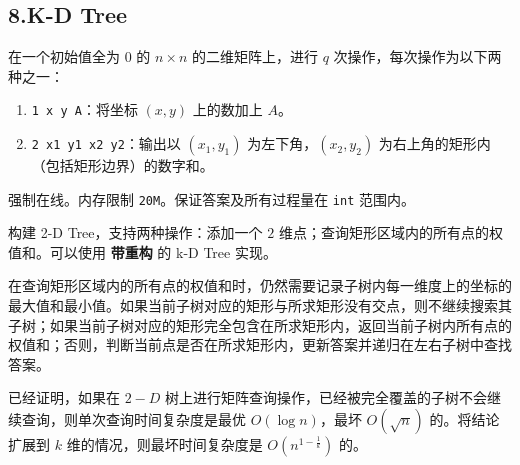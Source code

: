 \documentclass[]{article}
\providecommand{\tightlist}{%
  \setlength{\itemsep}{0pt}\setlength{\parskip}{0pt}}
\begin{document}
\hypertarget{k-d-tree}{%
\subsection{8.K-D Tree}\label{k-d-tree}}

在一个初始值全为 \(0\) 的 \(n\times n\) 的二维矩阵上，进行 \(q\)
次操作，每次操作为以下两种之一：

\begin{enumerate}
\def\labelenumi{\arabic{enumi}.}
\tightlist
\item
  \texttt{1\ x\ y\ A}：将坐标 \((x,y)\) 上的数加上 \(A\)。
\item
  \texttt{2\ x1\ y1\ x2\ y2}：输出以 \((x_1,y_1)\)
  为左下角，\((x_2,y_2)\) 为右上角的矩形内（包括矩形边界）的数字和。
\end{enumerate}

强制在线。内存限制 \texttt{20M}。保证答案及所有过程量在 \texttt{int}
范围内。

构建 2-D Tree，支持两种操作：添加一个 \(2\)
维点；查询矩形区域内的所有点的权值和。可以使用 \textbf{带重构} 的 k-D
Tree 实现。

在查询矩形区域内的所有点的权值和时，仍然需要记录子树内每一维度上的坐标的最大值和最小值。如果当前子树对应的矩形与所求矩形没有交点，则不继续搜索其子树；如果当前子树对应的矩形完全包含在所求矩形内，返回当前子树内所有点的权值和；否则，判断当前点是否在所求矩形内，更新答案并递归在左右子树中查找答案。

已经证明，如果在 \(2-D\)
树上进行矩阵查询操作，已经被完全覆盖的子树不会继续查询，则单次查询时间复杂度是最优
\(O(\log n)\)，最坏 \(O(\sqrt n)\) 的。将结论扩展到 \(k\)
维的情况，则最坏时间复杂度是 \(O(n^{1-\frac 1 k})\) 的。
\end{document}
